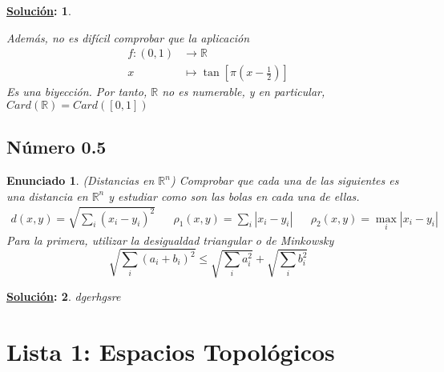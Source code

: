\documentclass[10pt,a4paper,openright]{book}
\theoremstyle{break}
\newtheorem*{enun}{Enunciado}
\newtheorem*{ej}{\underline{Solución}:}
\begin{document}
\begin{ej}
\begin{enumerate}[label={(\arabic*)}]
Además, no es difícil comprobar que la aplicación 
\begin{align*}
f: (0,1) &\rightarrow \mathbb{R} \\
x &\mapsto \tan\left[\pi (x - \frac{1}{2})\right]
\end{align*}
Es una biyección. Por tanto, $\mathbb{R}$ no es numerable, y en particular, $Card(\mathbb{R}) = Card([0,1])$
\end{enumerate}

\end{ej}

\section{Número 0.5}
\begin{enun}
(Distancias en $\mathbb{R}^n$) Comprobar que cada una de las siguientes es una distancia en $\mathbb{R}^n$ y estudiar como son las bolas en cada una de ellas.
\begin{align*}
d(x,y) = \sqrt{\sum_i (x_i - y_i)^2} && \rho_1(x,y) = \sum_i | x_i - y_i| && \rho_2 (x,y) = \max_i |x_i -y_i|
\end{align*}
Para la primera, utilizar la \textit{desigualdad triangular} o \textit{de Minkowsky} $$\sqrt{\sum_i (a_i + b_i)^2} \leq \sqrt{\sum_i a_i^2} + \sqrt{\sum_i b_i^2}$$
\end{enun}
\begin{ej}
dgerhgsre
\end{ej}
\chapter{Lista 1: Espacios Topológicos}%
\label{cha:lista1}
\end{document}
